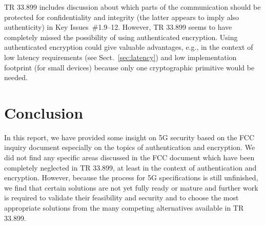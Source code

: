 \documentclass[12pt]{llncs}
\begin{document}
TR 33.899 includes discussion about which parts of the communication should be protected for confidentiality and integrity (the latter appears to imply also authenticity) in Key Issues~\#1.9--12. However, TR 33.899 seems to have completely missed the possibility of using authenticated encryption. Using authenticated encryption could give valuable advantages, e.g., in the context of low latency requirements (see Sect.~\ref{sec:latency}) and low implementation footprint (for small devices) because only one cryptographic primitive would be needed.


\section{Conclusion}
\label{sec:conclusion}

In this report, we have provided some insight on 5G security based on the FCC inquiry document especially on the topics of authentication and encryption. %
We did not find any specific areas discussed in the FCC document which have been completely neglected in TR 33.899, at least in the context of authentication and encryption. However, because the process for 5G specifications is still unfinished, we find that certain solutions are not yet fully ready or mature and further work is required to validate their feasibility and security and to choose the most appropriate solutions from the many competing alternatives available in TR 33.899.







\end{document}
